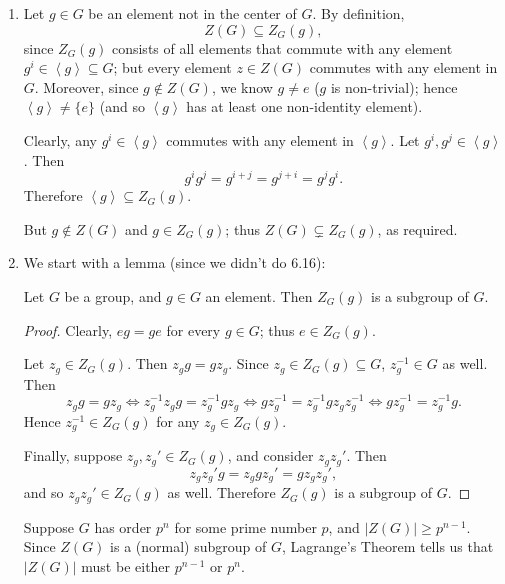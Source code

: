 \documentclass{homework}
\begin{document}
\begin{solution}
  \begin{enumerate}[label=(\alph*)]
    \item Let $g\in G$ be an element not in the center of $G$. By definition, \[
        Z(G)\subseteq Z_G(g)
      ,\] since $Z_G(g)$ consists of all elements that commute with any element $g^{i}\in \left<g
      \right>\subseteq G$; but every element $z\in Z(G)$ commutes with any element in $G$. Moreover,
      since $g\not\in Z(G)$, we know $g\neq e$ ($g$ is non-trivial); hence $\left<g \right>\neq \{ e
      \}$ (and so $\left<g \right>$ has at least one non-identity element). 

      Clearly, any $g^{i}\in \left<g \right>$ commutes with any element in $\left<g \right>$. Let
      $g^{i}, g^{j}\in \left<g \right>$. Then \[
        g^ig^j=g^{i+j}=g^{j+i}=g^{j}g^{i}
      .\] Therefore $\left<g \right>\subseteq Z_G(g)$. 

      But $g\not\in Z(G)$ and $g\in Z_G(g)$; thus $Z(G)\subsetneq Z_G(g)$, as required.

    \item We start with a lemma (since we didn't do 6.16):
      \begin{lemma}[$Z_G(g)$ is Subgroup]{}
        Let $G$ be a group, and $g\in G$ an element. Then $Z_G(g)$ is a subgroup of $G$.
      \end{lemma}
      \begin{proof}[Proof]
        Clearly, $eg=ge$ for every $g\in G$; thus $e\in Z_G(g)$.

        Let $z_g\in Z_G(g)$. Then $z_gg=gz_g$. Since $z_g\in Z_G(g)\subseteq G$, $z_g^{-1}\in G$ as
        well. Then \[
          z_gg=gz_g \iff z_g^{-1}z_gg=z_g^{-1}gz_g\iff
          gz_g^{-1}=z_g^{-1}gz_gz_g^{-1}\iff g z_g^{-1}=z_g^{-1}g
          .\] Hence $z_g^{-1}\in Z_G(g)$ for any $z_g\in Z_G(g)$.

          Finally, suppose $z_g,z_g'\in Z_G(g)$, and consider $z_gz_g'$. Then \[
            z_gz_g'g=z_ggz_g'=gz_gz_g'
          ,\] and so $z_gz_g'\in Z_G(g)$ as well. Therefore $Z_G(g)$ is a subgroup of $G$.
      \end{proof}
      
      Suppose $G$ has order $p^{n}$ for some prime number $p$, and $\left| Z(G) \right| \ge
      p^{n-1}$. Since $Z(G)$ is a (normal) subgroup of $G$, Lagrange's Theorem tells us that $\left|
      Z(G)\right| $ must be either $p^{n-1}$ or $p^{n}$.


\end{enumerate}
\end{solution}
\end{document}
